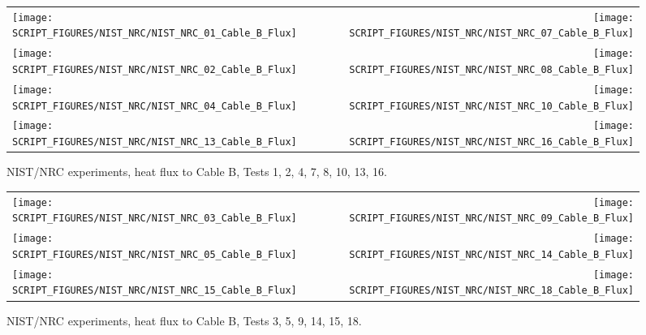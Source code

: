 \begin{figure}[p]
\begin{tabular*}{\textwidth}{l@{\extracolsep{\fill}}r}
\texttt{[image: SCRIPT\_FIGURES/NIST\_NRC/NIST\_NRC\_01\_Cable\_B\_Flux]} &
\texttt{[image: SCRIPT\_FIGURES/NIST\_NRC/NIST\_NRC\_07\_Cable\_B\_Flux]} \\
\texttt{[image: SCRIPT\_FIGURES/NIST\_NRC/NIST\_NRC\_02\_Cable\_B\_Flux]} &
\texttt{[image: SCRIPT\_FIGURES/NIST\_NRC/NIST\_NRC\_08\_Cable\_B\_Flux]} \\
\texttt{[image: SCRIPT\_FIGURES/NIST\_NRC/NIST\_NRC\_04\_Cable\_B\_Flux]} &
\texttt{[image: SCRIPT\_FIGURES/NIST\_NRC/NIST\_NRC\_10\_Cable\_B\_Flux]} \\
\texttt{[image: SCRIPT\_FIGURES/NIST\_NRC/NIST\_NRC\_13\_Cable\_B\_Flux]} &
\texttt{[image: SCRIPT\_FIGURES/NIST\_NRC/NIST\_NRC\_16\_Cable\_B\_Flux]}
\end{tabular*}
\caption[NIST/NRC experiments, heat flux to Cable B, Tests 1, 2, 4, 7, 8, 10, 13, 16]
{NIST/NRC experiments, heat flux to Cable B, Tests 1, 2, 4, 7, 8, 10, 13, 16.}
\label{NIST_NRC_Cable_B_Flux_Closed}
\end{figure}

\begin{figure}[p]
\begin{tabular*}{\textwidth}{l@{\extracolsep{\fill}}r}
\texttt{[image: SCRIPT\_FIGURES/NIST\_NRC/NIST\_NRC\_03\_Cable\_B\_Flux]} &
\texttt{[image: SCRIPT\_FIGURES/NIST\_NRC/NIST\_NRC\_09\_Cable\_B\_Flux]} \\
\texttt{[image: SCRIPT\_FIGURES/NIST\_NRC/NIST\_NRC\_05\_Cable\_B\_Flux]} &
\texttt{[image: SCRIPT\_FIGURES/NIST\_NRC/NIST\_NRC\_14\_Cable\_B\_Flux]} \\
\texttt{[image: SCRIPT\_FIGURES/NIST\_NRC/NIST\_NRC\_15\_Cable\_B\_Flux]} &
\texttt{[image: SCRIPT\_FIGURES/NIST\_NRC/NIST\_NRC\_18\_Cable\_B\_Flux]}
\end{tabular*}
\caption[NIST/NRC experiments, heat flux to Cable B, Tests 3, 5, 9, 14, 15, 18]
{NIST/NRC experiments, heat flux to Cable B, Tests 3, 5, 9, 14, 15, 18.}
\label{NIST_NRC_Cable_B_Flux_Open}
\end{figure}


